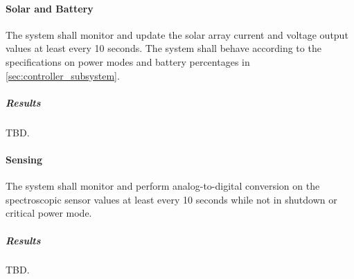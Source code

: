 \paragraph{Solar and Battery} The system shall monitor and update the solar array current and voltage output values at least every 10 seconds. The system shall behave according to the specifications on power modes and battery percentages in \autoref{sec:controller_subsystem}.
\subparagraph{Results} TBD.

\paragraph{Sensing} The system shall monitor and perform analog-to-digital conversion on the spectroscopic sensor values at least every 10 seconds while not in shutdown or critical power mode.
\subparagraph{Results} TBD.